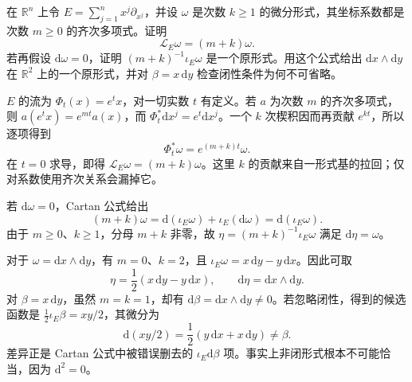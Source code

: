 \begin{exercise}\label{g1:ex:homogeneous-closed-form-primitive}
	在 \(\mathbb R^n\) 上令 \(E=\sum_{j=1}^n x^j\partial_{x^j}\)，并设 \(\omega\) 是次数 \(k\geq1\) 的微分形式，其坐标系数都是次数 \(m\geq0\) 的齐次多项式。证明
	\[
		\mathcal L_E\omega=(m+k)\omega.
	\]
	若再假设 \(\mathrm{d}\omega=0\)，证明 \((m+k)^{-1}\iota_E\omega\) 是一个原形式。用这个公式给出 \(\mathrm{d}x\wedge\mathrm{d}y\) 在 \(\mathbb R^2\) 上的一个原形式，并对 \(\beta=x\,\mathrm{d}y\) 检查闭性条件为何不可省略。
\end{exercise}
\begin{solution}
	\(E\) 的流为 \(\Phi_t(x)=e^t x\)，对一切实数 \(t\) 有定义。若 \(a\) 为次数 \(m\) 的齐次多项式，则 \(a(e^t x)=e^{mt}a(x)\)，而 \(\Phi_t^*\mathrm{d}x^j=e^t\mathrm{d}x^j\)。一个 \(k\) 次楔积因而再贡献 \(e^{kt}\)，所以逐项得到
	\[
		\Phi_t^*\omega=e^{(m+k)t}\omega.
	\]
	在 \(t=0\) 求导，即得 \(\mathcal L_E\omega=(m+k)\omega\)。这里 \(k\) 的贡献来自一形式基的拉回；仅对系数使用齐次关系会漏掉它。

	若 \(\mathrm{d}\omega=0\)，Cartan 公式给出
	\[
		(m+k)\omega=\mathrm{d}(\iota_E\omega)+\iota_E(\mathrm{d}\omega)
		=\mathrm{d}(\iota_E\omega).
	\]
	由于 \(m\geq0\)、\(k\geq1\)，分母 \(m+k\) 非零，故 \(\eta=(m+k)^{-1}\iota_E\omega\) 满足 \(\mathrm{d}\eta=\omega\)。

	对于 \(\omega=\mathrm{d}x\wedge\mathrm{d}y\)，有 \(m=0\)、\(k=2\)，且 \(\iota_E\omega=x\,\mathrm{d}y-y\,\mathrm{d}x\)。因此可取
	\[
		\eta=\frac12(x\,\mathrm{d}y-y\,\mathrm{d}x),\qquad
		\mathrm{d}\eta=\mathrm{d}x\wedge\mathrm{d}y.
	\]
	对 \(\beta=x\,\mathrm{d}y\)，虽然 \(m=k=1\)，却有 \(\mathrm{d}\beta=\mathrm{d}x\wedge\mathrm{d}y\ne0\)。若忽略闭性，得到的候选函数是 \(\tfrac12\iota_E\beta=xy/2\)，其微分为
	\[
		\mathrm{d}(xy/2)=\frac12(y\,\mathrm{d}x+x\,\mathrm{d}y)\ne\beta.
	\]
	差异正是 Cartan 公式中被错误删去的 \(\iota_E\mathrm{d}\beta\) 项。事实上非闭形式根本不可能恰当，因为 \(\mathrm{d}^2=0\)。
\end{solution}

